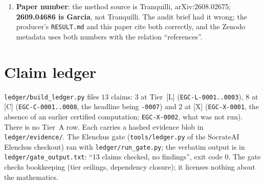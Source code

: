 \documentclass[10pt]{article}
\newcommand{\tier}[1]{\textsf{[#1]}}
\newcommand{\tL}{\tier{L}}
\newcommand{\tC}{\tier{C}}
\newcommand{\tX}{\tier{X}}
\begin{document}
\begin{enumerate}
\item \textbf{Paper number}: the method source is Tranquilli, arXiv:2608.02675; \textbf{2609.04686 is Garcia}, not Tranquilli. The audit brief had it wrong; the producer's \texttt{RESULT.md} and this paper cite both correctly, and the Zenodo metadata uses both numbers with the relation ``references''.
\end{enumerate}

\section{Claim ledger}\label{sec:ledger}
\texttt{ledger/build\_ledger.py} files $13$ claims: $3$ at Tier~\tL{} (\texttt{EGC-L-0001..0003}), $8$ at \tC{} (\texttt{EGC-C-0001..0008}, the headline being \texttt{-0007}) and $2$ at \tX{} (\texttt{EGC-X-0001}, the absence of an earlier certified computation; \texttt{EGC-X-0002}, what was not run). There is no Tier~A row. Each carries a hashed evidence blob in \texttt{ledger/evidence/}. The Elenchus gate (\texttt{tools/ledger.py} of the SocrateAI Elenchus checkout) ran with \texttt{ledger/run\_gate.py}; the verbatim output is in \texttt{ledger/gate\_output.txt}: ``13 claims checked, no findings'', exit code $0$. The gate checks bookkeeping (tier ceilings, dependency closure); it licenses nothing about the mathematics.

\end{document}
